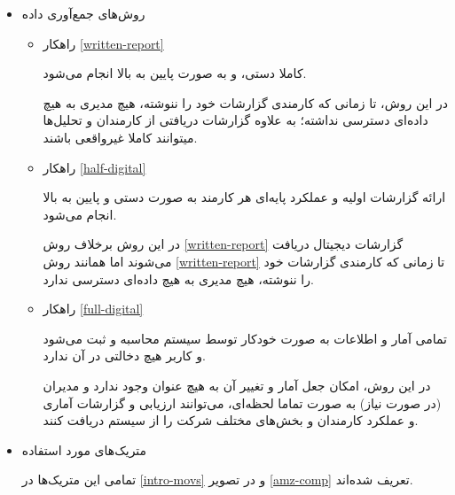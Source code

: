 \documentclass[12pt]{article}
\begin{document}
\begin{itemize}
\item         
روش‌های جمع‌آوری داده

\begin{itemize}
    \item راهکار \ref{written-report} 
    
    کاملا دستی، و به صورت پایین به بالا انجام می‌شود.
  
  در این روش، تا زمانی که کارمندی گزارشات خود را ننوشته، هیچ مدیری به هیچ داده‌ای دسترسی نداشته؛ به علاوه گزارشات دریافتی از کارمندان و تحلیل‌ها میتوانند کاملا غیرواقعی‌ باشند.
    \item راهکار \ref{half-digital}
    
    ارائه گزارشات اولیه و عملکرد پایه‌ای هر کارمند به صورت دستی و پایین به بالا انجام می‌شود.
    
    در این روش برخلاف روش \ref{written-report} گزارشات دیجیتال دریافت می‌شوند اما همانند روش \ref{written-report} تا زمانی که کارمندی گزارشات خود را ننوشته، هیچ مدیری به هیچ داده‌ای دسترسی ندارد.
    
    \item راهکار \ref{full-digital}
    
    تمامی آمار و اطلاعات به صورت خودکار توسط سیستم محاسبه و ثبت می‌شود و کاربر هیچ دخالتی در آن ندارد.
    
    در این روش، امکان جعل آمار و تغییر آن به هیچ عنوان وجود ندارد و مدیران (در صورت نیاز) به صورت تماما لحظه‌ای، می‌توانند ارزیابی و گزارشات آماری و عملکرد کارمندان و بخش‌های مختلف شرکت را از سیستم دریافت کنند.
\end{itemize}
\item         
متریک‌های مورد استفاده

تمامی این متریک‌ها در \ref{intro-movs} و در تصویر \ref{amz-comp} تعریف شده‌اند.


\end{itemize}
\end{document}
